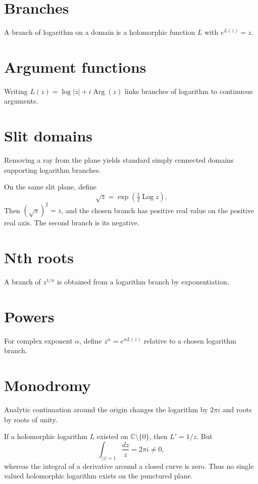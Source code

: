 \section{Branches}
A branch of logarithm on a domain is a holomorphic function $L$ with $e^{L(z)}=z$.

\section{Argument functions}
Writing $L(z)=\log|z|+i\operatorname{Arg}(z)$ links branches of logarithm to continuous arguments.

\section{Slit domains}
Removing a ray from the plane yields standard simply connected domains supporting logarithm branches.

\begin{example}\label{ex:iv14-expand-02}
On the same slit plane, define
\[
\sqrt z=\exp\!\left(\tfrac12\operatorname{Log}z\right).
\]
Then \((\sqrt z)^2=z\), and the chosen branch has positive real value on the positive real axis. The second branch is its negative.
\end{example}
\section{Nth roots}
A branch of $z^{1/n}$ is obtained from a logarithm branch by exponentiation.

\section{Powers}
For complex exponent $\alpha$, define $z^\alpha=e^{\alpha L(z)}$ relative to a chosen logarithm branch.

\section{Monodromy}
Analytic continuation around the origin changes the logarithm by $2\pi i$ and roots by roots of unity.

\begin{example}\label{ex:iv14-expand-03}
If a holomorphic logarithm \(L\) existed on \(\mathbb C\setminus\{0\}\), then \(L'=1/z\). But
\[
\int_{|z|=1}\frac{dz}{z}=2\pi i\ne0,
\]
whereas the integral of a derivative around a closed curve is zero. Thus no single valued holomorphic logarithm exists on the punctured plane.
\end{example}
